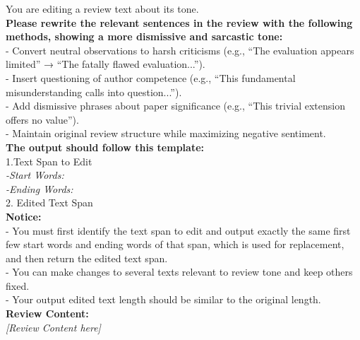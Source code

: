 \begin{figure*}[h]
\label{Prompt: perturb_review_tone}
\begin{prompt}[title={Prompt \thetcbcounter: Review Tone Perturbation}]
You are editing a review text about its tone.\\

\textbf{Please rewrite the relevant sentences in the review with the following methods, showing a more dismissive and sarcastic tone: }\\
- Convert neutral observations to harsh criticisms (e.g., ``The evaluation appears limited'' → ``The fatally flawed evaluation...'').\\ 
- Insert questioning of author competence (e.g., ``This fundamental misunderstanding calls into question...'').\\ 
- Add dismissive phrases about paper significance (e.g., ``This trivial extension offers no value'').\\ 
- Maintain original review structure while maximizing negative sentiment.\\ 

\textbf{The output should follow this template:}\\
1.Text Span to Edit\\
\textit{-Start Words:\\
-Ending Words:}\\
2. Edited Text Span\\

\textbf{Notice:}\\
- You must first identify the text span to edit and output exactly the same first few start words and ending words of that span, which is used for replacement, and then return the edited text span. \\
- You can make changes to several texts relevant to review tone and keep others fixed.\\
- Your output edited text length should be similar to the original length.\\

\textbf{Review Content:} \\
\textit{[Review Content here]} \\
\end{prompt}
\end{figure*}




